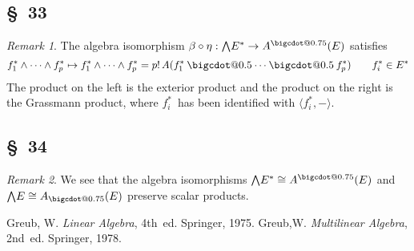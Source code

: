 \documentclass[letterpaper,12pt]{article}
\makeatletter
\newcommand{\iso}{\cong}
\newcommand{\bigcdot}[1]{\mathbin{\mathpalette\bigcdot@{#1}}}
\newcommand{\bigcdot@}[2]{%
  \sbox0{$#1\vcenter{}$}%
  \sbox2{$#1\cdot\m@th$}%
  \hbox{%
    \hfil
    \raise\ht0\hbox{%
      \scalebox{#2}{%
        \lower\ht0\hbox{$#1\bullet\m@th$}%
      }%
    }%
    \hfil
  }%
}
\newcommand{\after}{\circ}
\newcommand{\eprod}{\wedge}
\newcommand{\bigeprod}{\bigwedge}
\newcommand{\medeprod}{{\textstyle\bigeprod}}
\newcommand{\fprod}{\bigcdot{0.5}}
\newcommand{\adot}{\bigcdot{0.75}}
\newcommand{\sprod}[2]{\langle#1,#2\rangle}
\newcommand{\multi}[4]{#2_{#3}#1\cdots#1#2_{#4}}
\newcommand{\eprods}[3]{\multi{\eprod}{#1}{#2}{#3}}
\newcommand{\fprods}[3]{\multi{\fprod}{#1}{#2}{#3}}
\theoremstyle{definition}
\theoremstyle{remark}
\newtheorem*{rmk}{Remark}
\makeatother
\begin{document}
\subsection*{\S~33}
\begin{rmk}
The algebra isomorphism \(\beta\after\eta:\medeprod E^*\to A^{\adot}(E)\) satisfies
\[\eprods{f^*}{1}{p}\mapsto\eprods{f^*}{1}{p}=p!\,A(\fprods{f^*}{1}{p})\qquad f^*_i\in E^*\]
The product on the left is the exterior product and the product on the right is the Grassmann product, where \(f^*_i\)~has been identified with \(\sprod{f^*_i}{-}\).
\end{rmk}

\subsection*{\S~34}
\begin{rmk}
We see that the algebra isomorphisms \(\medeprod E^*\iso A^{\adot}(E)\) and \(\medeprod E\iso A_{\adot}(E)\) preserve scalar products.
\end{rmk}

\newpage
\begin{thebibliography}{0}
 Greub, W. \textit{Linear Algebra}, 4th~ed. Springer, 1975.
 Greub,W. \textit{Multilinear Algebra}, 2nd~ed. Springer, 1978.
\end{thebibliography}
\end{document}
